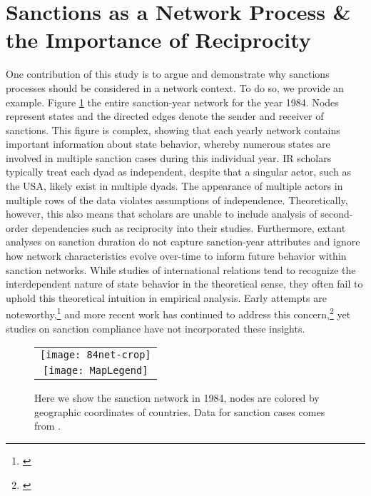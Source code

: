 \section*{Sanctions as a Network Process \& the Importance of Reciprocity}
\label{neteffects}

One contribution of this study is to argue and demonstrate why sanctions processes should be considered in a network context. To do so, we provide an example. Figure \ref{fig:spaghetti}  the entire sanction-year network for the year 1984.  Nodes represent states and the directed edges denote the sender and receiver of sanctions. This figure is complex, showing that each yearly network contains important information about state behavior, whereby numerous states are involved in multiple sanction cases during this individual year.  IR scholars typically treat each dyad as independent, despite that a singular actor, such as the USA, likely exist in multiple dyads. The appearance of multiple actors in multiple rows of the data violates assumptions of independence. Theoretically, however, this also means that scholars are unable to include analysis of second-order dependencies such as reciprocity into their studies. Furthermore, extant analyses on sanction duration do not capture sanction-year attributes and ignore how network characteristics evolve over-time to inform future behavior within sanction networks. While studies of international relations tend to recognize the interdependent nature of state behavior in the theoretical sense, they often fail to uphold this theoretical intuition in empirical analysis. Early attempts are noteworthy,\footnote{\cite{keohane1989reciprocity,goldstein1991reciprocity}} and more recent work has continued to address this concern,\footnote{\cite{mitchell2001,cranmer2014reciprocity}} yet studies on sanction compliance have not incorporated these insights. 

\begin{figure}[ht]
  \centering
  \begin{tabular}{c}
	  \texttt{[image: 84net-crop]} \\
	  \texttt{[image: MapLegend]}
  \end{tabular}
  \caption{Here we show the sanction network in 1984, nodes are colored by geographic coordinates of countries. Data for sanction cases comes from \citet{morgan2009threat}.}
  \label{fig:spaghetti}
\end{figure}
\FloatBarrier


